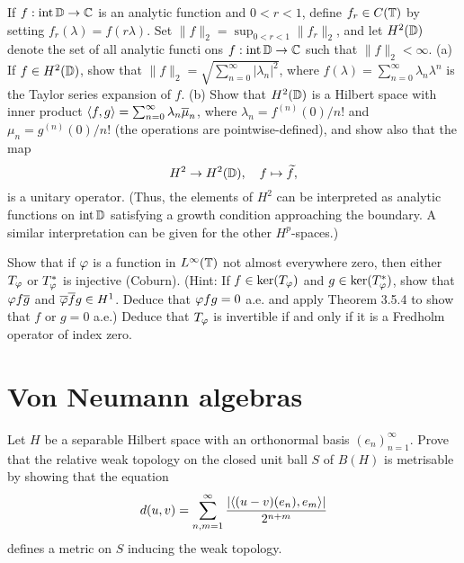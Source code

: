 \documentclass[12pt]{article}
\begin{document}
\begin{prb}
If $f:\operatorname{int}\mathbb{D}\to\mathbb{C}$ is an analytic function and $0<r<1$, define $f_r\in C(\mathbb{T})$ by setting $f_r(\lambda)=f(r\lambda)$.
Set $\|f\|_2=\sup_{0<r<1}\|f_r\|_2$, and let $H^2(\mathbb{D})$ denote the set of all analytic functi ons $f:\operatorname{int}\mathbb{D}\to\mathbb{C}$ such that $\|f\|_2<\infty$.
(a) If $f\in H^2(\mathbb{D})$, show that $\|f\|_2=\sqrt{\sum_{n=0}^\infty|\lambda_n|^2}$, where $f(\lambda)=\sum_{n=0}^\infty\lambda_n\lambda^n$ is the Taylor series expansion of $f$.
(b) Show that $H^2(\mathbb{D})$ is a Hilbert space with inner product $\langle f,g\rangle=\sum_{n=0}^\infty\lambda_n\overline\mu_n$, where $\lambda_n=f^{(n)}(0)/n!$ and $\mu_n=g^{(n)}(0)/n!$ (the operations are pointwise-defined), and show also that the map 
\[H^2\to H^2(\mathbb{D}),\quad f\mapsto\widetilde f,\]
is a unitary operator.
(Thus, the elements of $H^2$ can be interpreted as analytic functions on $\operatorname{int}\mathbb{D}$ satisfying a growth condition approaching the boundary.
A similar interpretation can be given for the other $H^p$-spaces.)
\end{prb}
\begin{sol}
\end{sol}


\begin{prb}
Show that if $\varphi$ is a function in $L^\infty(\mathbb{T})$ not almost everywhere zero, then either $T_\varphi$ or $T_\varphi^*$ is injective (Coburn).
(Hint: If $f\in\ker(T_\varphi)$ and $g\in\ker(T_\varphi^*)$, show that $\varphi f\overline g$ and $\overline{\varphi}\overline fg\in H^1$.
Deduce that $\varphi fg=0$ a.e. and apply Theorem 3.5.4 to show that $f$ or $g=0$ a.e.)
Deduce that $T_\varphi$ is invertible if and only if it is a Fredholm operator of index zero.
\end{prb}
\begin{sol}
\end{sol}


\section{Von Neumann algebras}

\begin{prb}
Let $H$ be a separable Hilbert space with an orthonormal basis $(e_n)_{n=1}^\infty$.
Prove that the relative weak topology on the closed unit ball $S$ of $B(H)$ is metrisable by showing that the equation
\[d(u,v)=\sum_{n,m=1}^\infty\frac{|\langle(u-v)(e_n), e_m\rangle|}{2^{n+m}}\]
defines a metric on $S$ inducing the weak topology.
\end{prb}
\begin{sol}
\end{sol}
\end{document}
